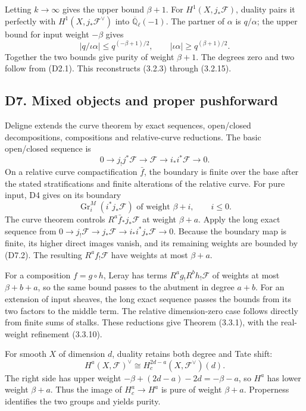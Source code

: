Letting \(k\to\infty\) gives the upper bound \(\beta+1\). For
\(H^1(X,j_*\mathcal F)\), duality pairs it perfectly with
\(H^1(X,j_*\mathcal F^\vee)\) into \(\overline{\mathbb Q}_\ell(-1)\).
The partner of \(\alpha\) is \(q/\alpha\); the upper bound for input
weight \(-\beta\) gives \[
|q/\iota\alpha|\le q^{(-\beta+1)/2},
\qquad |\iota\alpha|\ge q^{(\beta+1)/2}.
\tag{D6.13}
\] Together the two bounds give purity of weight \(\beta+1\). The
degrees zero and two follow from (D2.1). This reconstructs (3.2.3)
through (3.2.15).

\subsection{D7. Mixed objects and proper
pushforward}\label{d7.-mixed-objects-and-proper-pushforward}

Deligne extends the curve theorem by exact sequences, open/closed
decompositions, compositions and relative-curve reductions. The basic
open/closed sequence is \[
0\to j_!j^*\mathcal F\to\mathcal F\to i_*i^*\mathcal F\to0.
\tag{D7.1}
\] On a relative curve compactification \(\bar f\), the boundary is
finite over the base after the stated stratifications and finite
alterations of the relative curve. For pure input, D4 gives on its
boundary \[
\operatorname{Gr}_i^M(i^*j_*\mathcal F)
\text{ of weight }\beta+i,\qquad i\le0.
\tag{D7.2}
\] The curve theorem controls \(R^a\bar f_*j_*\mathcal F\) at weight
\(\beta+a\). Apply the long exact sequence from
\(0\to j_!\mathcal F\to j_*\mathcal F\to i_*i^*j_*\mathcal F\to0\).
Because the boundary map is finite, its higher direct images vanish, and
its remaining weights are bounded by (D7.2). The resulting
\(R^af_!\mathcal F\) have weights at most \(\beta+a\).

For a composition \(f=g\circ h\), Leray has terms
\(R^ag_!R^bh_!\mathcal F\) of weights at most \(\beta+b+a\), so the same
bound passes to the abutment in degree \(a+b\). For an extension of
input sheaves, the long exact sequence passes the bounds from its two
factors to the middle term. The relative dimension-zero case follows
directly from finite sums of stalks. These reductions give Theorem
(3.3.1), with the real-weight refinement (3.3.10).

For smooth \(X\) of dimension \(d\), duality retains both degree and
Tate shift: \[
H^a(X,\mathcal F)^\vee
\cong H_c^{2d-a}(X,\mathcal F^\vee)(d).
\tag{D7.3}
\] The right side has upper weight \(-\beta+(2d-a)-2d=-\beta-a\), so
\(H^a\) has lower weight \(\beta+a\). Thus the image of \(H_c^a\to H^a\)
is pure of weight \(\beta+a\). Properness identifies the two groups and
yields purity.

